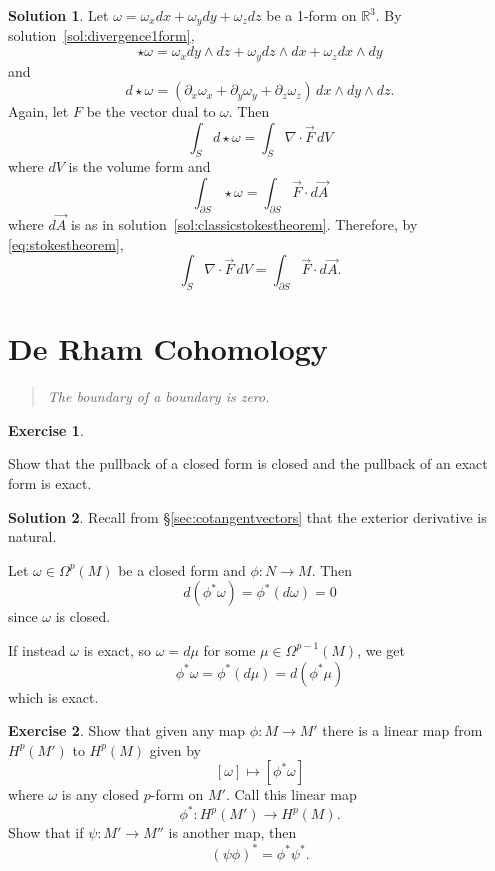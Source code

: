 \documentclass[11pt, a4paper]{report}
\theoremstyle{definition}
\newtheorem{ex}{Exercise}[part]
\newtheorem{sol}{Solution}[part]
\newenvironment{epigraph}
    {\begin{quote}\small\itshape} %
    {\end{quote}\ignorespacesafterend\vspace{\parskip}}
\begin{document}
\begin{sol}

Let $\omega = \omega_x dx + \omega_y dy + \omega_z dz$ be a 1-form on $\mathbb{R}^3$. By solution~\ref{sol:divergence1form},
\[
    \star \omega = \omega_x dy \wedge dz + \omega_y dz \wedge dx + \omega_z dx \wedge dy
\]
and
\[
    d \star \omega = (\partial_x \omega_x + \partial_y \omega_y + \partial_z \omega_z) \, dx \wedge dy \wedge dz.
\]
Again, let $F$ be the vector dual to $\omega$. Then
\[
    \int_S d \star \omega = \int_S \nabla \cdot \vec{F} \, dV
\]
where $dV$ is the volume form and
\[
    \int_{\partial S} \star \omega = \int_{\partial S} \vec{F} \cdot d\vec{A}
\]
where $d\vec{A}$ is as in solution~\ref{sol:classicstokestheorem}.
Therefore, by \ref{eq:stokestheorem}, %
\[
    \int_S \nabla \cdot \vec{F} \, dV = \int_{\partial S} \vec{F} \cdot d\vec{A}.
\]

\end{sol}

\section{De Rham Cohomology}

\begin{epigraph}
    The boundary of a boundary is zero.
\end{epigraph}

\begin{ex}\label{ex:pullbackclosedandexact}

Show that the pullback of a closed form is closed
and the pullback of an exact form is exact.

\end{ex}

\begin{sol}

Recall from \S\ref{sec:cotangentvectors} that the exterior derivative is natural.

Let $\omega \in \Omega^p(M)$ be a closed form and $\phi: N \to M$. Then
\[
    d (\phi^* \omega) = \phi^* (d \omega) = 0
\]
since $\omega$ is closed.

If instead $\omega$ is exact, so $\omega = d\mu$ for some $\mu \in \Omega^{p - 1}(M)$, we get
\[
    \phi^* \omega = \phi^* (d \mu) = d (\phi^* \mu)
\]
which is exact.

\end{sol}

\begin{ex}

Show that given any map $\phi: M \to M'$ there is a linear map from $H^p(M')$ to $H^p(M)$ given by
\[
    [\omega] \mapsto [\phi^* \omega]
\]
where $\omega$ is any closed $p$-form on $M'$. Call this linear map
\[
    \phi^*: H^p(M') \to H^p(M).
\]
Show that if $\psi: M' \to M''$ is another map, then
\[
    {(\psi \phi)}^* = \phi^* \psi^*.
\]

\end{ex}
\end{document}
